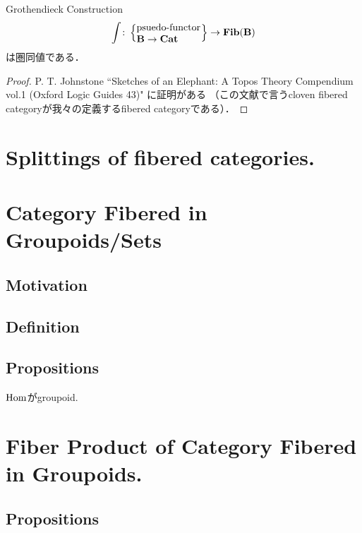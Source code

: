 \documentclass[a4paper, dvipdfmx]{jsarticle}
\newcommand{\Fib}[1]{\cat{Fib}(\cat{#1})}
\begin{document}
\begin{Thm}
    Grothendieck Construction
    \[
        \int \colon  \left\{ \parbox{2.3cm}{psuedo-functor \\ \quad \ $\cat{B} \to \Cat$} \right\}
            \to \Fib{B}
    \]
    は圏同値である．
\end{Thm}
\begin{proof}
    P. T. Johnstone
        ``Sketches of an Elephant: A Topos Theory Compendium vol.1 (Oxford Logic Guides 43)"
    に証明がある
    （この文献で言うcloven fibered categoryが我々の定義するfibered categoryである）．
\end{proof}

\section{Splittings of fibered categories.}
\begin{Def}
    
\end{Def}

\section{Category Fibered in Groupoids/Sets}
\subsection{Motivation}

\subsection{Definition}
\begin{Def}
\end{Def}

\begin{Def}
\end{Def}

\subsection{Propositions}
\begin{Prop}
    $\operatorname{Hom}$がgroupoid.
\end{Prop}

\begin{Thm}
\end{Thm}




\section{Fiber Product of Category Fibered in Groupoids.}

\subsection{Propositions}
\end{document}
